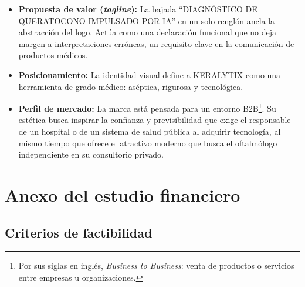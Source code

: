         \begin{itemize}[leftmargin=*]
            \item \textbf{Propuesta de valor (\textit{tagline}):} La bajada ``DIAGNÓSTICO DE QUERATOCONO IMPULSADO POR IA'' en un solo renglón ancla la abstracción del logo. Actúa como una declaración funcional que no deja margen a interpretaciones erróneas, un requisito clave en la comunicación de productos médicos.

            \item \textbf{Posicionamiento:} La identidad visual define a KERALYTIX como una herramienta de grado médico: aséptica, rigurosa y tecnológica.

            \item \textbf{Perfil de mercado:} La marca está pensada para un entorno B2B\footnote{Por sus siglas en inglés, \textit{Business to Business}: venta de productos o servicios entre empresas u organizaciones.}. Su estética busca inspirar la confianza y previsibilidad que exige el responsable de un hospital o de un sistema de salud pública al adquirir tecnología, al mismo tiempo que ofrece el atractivo moderno que busca el oftalmólogo independiente en su consultorio privado.
        \end{itemize}


\section{Anexo del estudio financiero}
\label{sec:anexo_estudio_financiero}

    \subsection*{Criterios de factibilidad}


